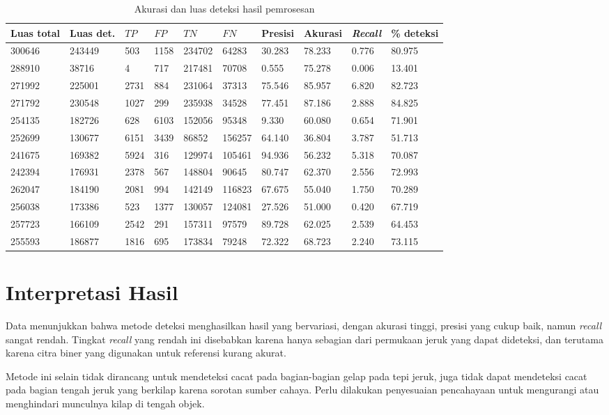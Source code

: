\documentclass[laporan.tex]{subfiles}
\begin{document}
\begin{table}[h!]
\small
\centering
\begin{tabular} {|l|l|l|l|l|l|l|l|l|l|}
\hline
Luas total & Luas det.&  $TP$ & $FP$ & $TN$ & $FN$ & Presisi & Akurasi & \emph{Recall} & \% deteksi \\
\hline
300646&243449&503&1158&234702&64283&30.283&78.233&0.776&80.975 \\
288910&38716&4&717&217481&70708&0.555&75.278&0.006&13.401 \\
271992&225001&2731&884&231064&37313&75.546&85.957&6.820&82.723 \\
271792&230548&1027&299&235938&34528&77.451&87.186&2.888&84.825 \\
254135&182726&628&6103&152056&95348&9.330&60.080&0.654&71.901 \\
252699&130677&6151&3439&86852&156257&64.140&36.804&3.787&51.713 \\
241675&169382&5924&316&129974&105461&94.936&56.232&5.318&70.087 \\
242394&176931&2378&567&148804&90645&80.747&62.370&2.556&72.993 \\
262047&184190&2081&994&142149&116823&67.675&55.040&1.750&70.289 \\
256038&173386&523&1377&130057&124081&27.526&51.000&0.420&67.719 \\
257723&166109&2542&291&157311&97579&89.728&62.025&2.539&64.453 \\
255593&186877&1816&695&173834&79248&72.322&68.723&2.240&73.115 \\
\hline
\end{tabular}
\normalsize
\caption{Akurasi dan luas deteksi hasil pemrosesan}
\label{table:detconfuse}
\end{table}

\section{Interpretasi Hasil}

Data menunjukkan bahwa metode deteksi menghasilkan hasil yang bervariasi, dengan akurasi tinggi, presisi yang cukup baik, namun \emph{recall} sangat rendah. Tingkat \emph{recall} yang rendah ini disebabkan karena hanya sebagian dari permukaan jeruk yang dapat dideteksi, dan terutama karena citra biner yang digunakan untuk referensi kurang akurat.

Metode ini selain tidak dirancang untuk mendeteksi cacat pada bagian-bagian gelap pada tepi jeruk, juga tidak dapat mendeteksi cacat pada bagian tengah jeruk yang berkilap karena sorotan sumber cahaya. Perlu dilakukan penyesuaian pencahayaan untuk mengurangi atau menghindari munculnya kilap di tengah objek.


\end{document}
